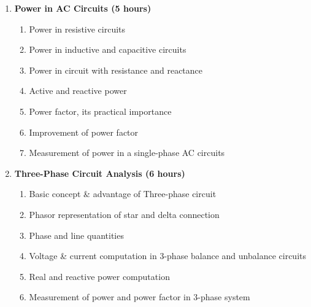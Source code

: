 \begin{enumerate}
    \item \textbf{ Power in AC Circuits \hfill (5 hours)}
    \begin{enumerate}
        \item Power in resistive circuits
        \item Power in inductive and capacitive circuits
        \item Power in circuit with resistance and reactance
        \item Active and reactive power
        \item Power factor, its practical importance
        \item Improvement of power factor
        \item Measurement of power in a single-phase AC circuits
    \end{enumerate}
    
    \item \textbf{Three-Phase Circuit Analysis \hfill (6 hours)}
    \begin{enumerate}
        \item Basic concept \& advantage of Three-phase circuit
        \item Phasor representation of star and delta connection
        \item Phase and line quantities
        \item Voltage \& current computation in 3-phase balance and unbalance circuits
        \item Real and reactive power computation
        \item Measurement of power and power factor in 3-phase system
    \end{enumerate}
    
\end{enumerate}


